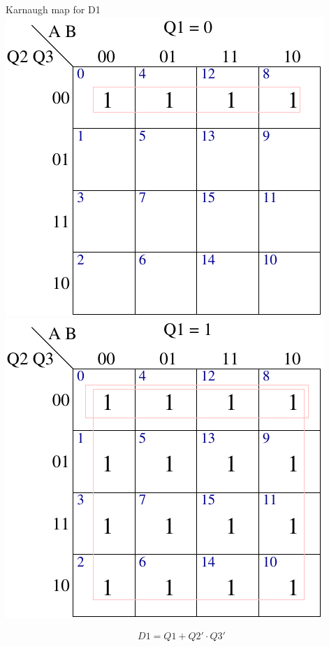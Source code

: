 \begin{frame}{Karnaugh map for D1}
  \includegraphics[scale=0.7]{D1Q1is0KMap}
  \includegraphics[scale=0.7]{D1Q1is1KMap}
\end{frame}

$$D1 = Q1 + Q2' \cdot Q3'$$

